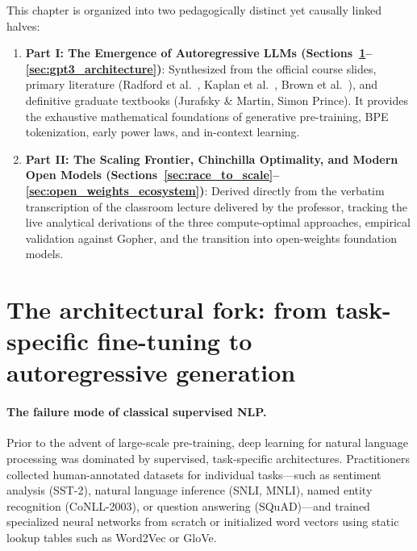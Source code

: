 \documentclass[../../main.tex]{subfiles}
\begin{document}
\begin{deepdive}
This chapter is organized into two pedagogically distinct yet causally linked halves:
\begin{enumerate}
    \item \textbf{Part I: The Emergence of Autoregressive LLMs (Sections~\ref{sec:architectural_fork}--\ref{sec:gpt3_architecture})}: Synthesized from the official course slides, primary literature (Radford et al.~\cite{radford2018,radford2019}, Kaplan et al.~\cite{kaplan2020}, Brown et al.~\cite{brown2020}), and definitive graduate textbooks (Jurafsky \& Martin, Simon Prince). It provides the exhaustive mathematical foundations of generative pre-training, BPE tokenization, early power laws, and in-context learning.
    \item \textbf{Part II: The Scaling Frontier, Chinchilla Optimality, and Modern Open Models (Sections~\ref{sec:race_to_scale}--\ref{sec:open_weights_ecosystem})}: Derived directly from the verbatim transcription of the classroom lecture delivered by the professor, tracking the live analytical derivations of the three compute-optimal approaches, empirical validation against Gopher, and the transition into open-weights foundation models.
\end{enumerate}
\end{deepdive}


\section{The architectural fork: from task-specific fine-tuning to autoregressive generation}
\label{sec:architectural_fork}

\paragraph{The failure mode of classical supervised NLP.}
Prior to the advent of large-scale pre-training, deep learning for natural language processing was dominated by supervised, task-specific architectures. Practitioners collected human-annotated datasets for individual tasks---such as sentiment analysis (SST-2), natural language inference (SNLI, MNLI), named entity recognition (CoNLL-2003), or question answering (SQuAD)---and trained specialized neural networks from scratch or initialized word vectors using static lookup tables such as Word2Vec or GloVe. 
\end{document}
